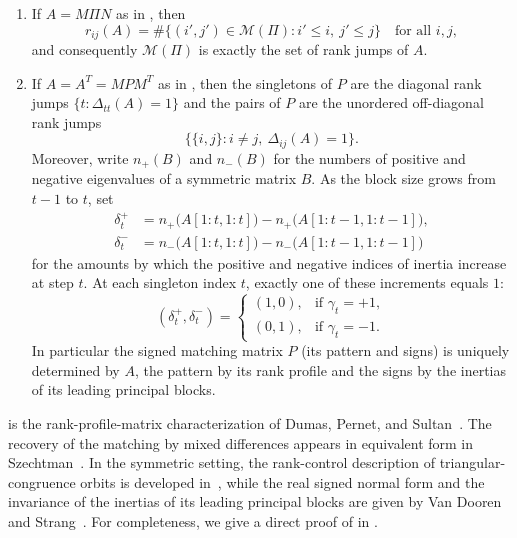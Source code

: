 \documentclass[preprint,12pt]{elsarticle}
\theoremstyle{plain}
\theoremstyle{nonumberplain}
\numberwithin{equation}{section}
\newcommand{\M}{\mathcal{M}}
\numberwithin{theorem}{section}
\begin{document}
\begin{proposition}[canonicity]\label{prop:canonical}
  \begin{enumerate}
    \item \label{part1} If $A = M \Pi N$ as in , then
      \[
        r_{ij}(A) = \#\{(i',j') \in \M(\Pi) \colon i' \le i,\ j' \le j\}
        \quad \text{for all } i, j,
      \]
      and consequently $\M(\Pi)$ is exactly the set of rank jumps of $A$.
    \item \label{part2} If $A = A^T = M P M^T$ as in , then the singletons of $P$ are the diagonal rank jumps $\{t \colon \Delta_{tt}(A) = 1\}$ and the pairs of $P$ are the unordered off-diagonal rank jumps
      $$
      \{\{i,j\} \colon i \neq j,\ \Delta_{ij}(A) = 1\}.
      $$
      Moreover, write $n_+(B)$ and $n_-(B)$ for the numbers of positive and negative eigenvalues of a symmetric matrix $B$. As the block size grows from $t-1$ to $t$, set
      \begin{align*}
        \delta^+_t &= n_+\bigl(A[1:t,1:t]\bigr) - n_+\bigl(A[1:t-1,1:t-1]\bigr),\\
        \delta^-_t &= n_-\bigl(A[1:t,1:t]\bigr) - n_-\bigl(A[1:t-1,1:t-1]\bigr)
      \end{align*}
      for the amounts by which the positive and negative indices of inertia increase at step $t$.  At each singleton index $t$, exactly one of these increments equals $1$:
      \[
        (\delta^+_t,\delta^-_t)=
        \begin{cases}
          (1,0), & \text{if } \gamma_t=+1,\\
          (0,1), & \text{if } \gamma_t=-1.
        \end{cases}
      \]
      In particular the signed matching matrix $P$ (its pattern and signs) is uniquely determined by $A$, the pattern by its rank profile and the signs by the inertias of its leading principal blocks.
  \end{enumerate}
\end{proposition}

 is the rank-profile-matrix characterization of Dumas, Pernet, and Sultan~\cite{dumas_pernet_sultan_2017}. The recovery of the matching by mixed differences appears in equivalent form in Szechtman~\cite[Eq.~(5.1)]{szechtman_2007}.  In the symmetric setting, the rank-control description of triangular-congruence orbits is developed in~\cite{szechtman_2007,bagno_cherniavsky_2012}, while the real signed normal form and the invariance of the inertias of its leading principal blocks are given by Van Dooren and Strang~\cite{vandooren_strang_2014}.  For completeness, we give a direct proof of  in .
\end{document}
